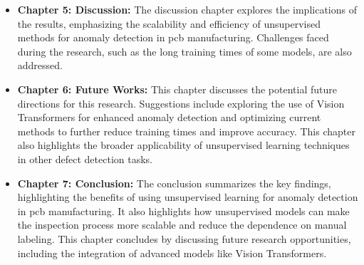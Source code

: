 \begin{itemize}
    \item \textbf{Chapter 5: Discussion:} The discussion chapter explores the implications of the results, emphasizing the scalability and efficiency of unsupervised methods for anomaly detection in \gls{pcb} manufacturing. Challenges faced during the research, such as the long training times of some models, are also addressed.

    \item \textbf{Chapter 6: Future Works:} This chapter discusses the potential future directions for this research. Suggestions include exploring the use of Vision Transformers for enhanced anomaly detection and optimizing current methods to further reduce training times and improve accuracy. This chapter also highlights the broader applicability of unsupervised learning techniques in other defect detection tasks.

    \item \textbf{Chapter 7: Conclusion:} The conclusion summarizes the key findings, highlighting the benefits of using unsupervised learning for anomaly detection in \gls{pcb} manufacturing. It also highlights how unsupervised models can make the inspection process more scalable and reduce the dependence on manual labeling. This chapter concludes by discussing future research opportunities, including the integration of advanced models like Vision Transformers.
\end{itemize}